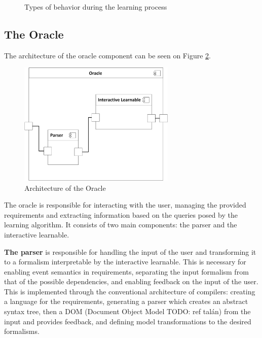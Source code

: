 \begin{figure}[!ht] 
	\centering
	\caption{Types of behavior during the learning process} 
	\label{fig_architcture_commandhandling}
\end{figure} 



\subsection{The Oracle} \label{subs_oracle}

The architecture of the oracle component can be seen on Figure \ref{fig_architcture_oracle}.

\begin{figure}[!ht] 
	\centering
		\includegraphics[width=75mm, keepaspectratio]{figures/architecture_oracle.png}
	\caption{Architecture of the Oracle} 
	\label{fig_architcture_oracle}
\end{figure}

The oracle is responsible for interacting with the user, managing the provided requirements and extracting information based on the queries posed by the learning algorithm. It consists of two main components: the parser and the interactive learnable.

\textbf{The parser} is responsible for handling the input of the user and transforming it to a formalism interpretable by the interactive learnable. This is necessary for enabling event semantics in requirements, separating the input formalism from that of the possible dependencies, and enabling feedback on the input of the user. This is implemented through the conventional architecture of compilers: creating a language for the requirements, generating a parser which creates an abstract syntax tree, then a DOM (Document Object Model TODO: ref talán) from the input and provides feedback, and defining model transformations to the desired formalisms.

